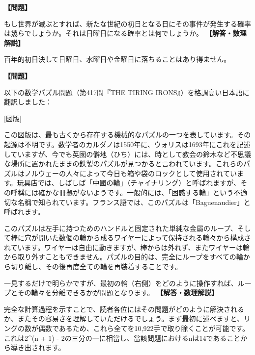 \documentclass[10pt,a4paper,oneside,openany]{ltjsbook}
\begin{document}
\begin{tcolorbox}[colback=softblue,colframe=primaryblue,title=\textbf{第 416 問：カレンダーのパズル （原題: A CALENDAR PUZZLE.）},arc=2mm,boxrule=1pt,breakable]
\textbf{【問題】}\par\vspace{0.3em}
もし世界が滅ぶとすれば、新たな世紀の初日となる日にその事件が発生する確率は幾らでしょうか。それは日曜日になる確率とは何でしょうか。
\tcblower
\textbf{【解答・数理解説】}\par\vspace{0.3em}
百年的初日決して日曜日、水曜日や金曜日に落ちることはあり得ません。
\end{tcolorbox}

\begin{tcolorbox}[colback=softblue,colframe=primaryblue,title=\textbf{第 417 問：疲労する鐸羣れ （原題: THE TIRING IRONS.）},arc=2mm,boxrule=1pt,breakable]
\textbf{【問題】}\par\vspace{0.3em}
以下の数学パズル問題（第417問『THE TIRING IRONS』）を格調高い日本語に翻訳しました：

[図版]

この図版は、最も古くから存在する機械的なパズルの一つを表しています。その起源は不明です。数学者のカルダノは1550年に、ウォリスは1693年にこれを記述していますが、今でも英國の僻地（ひち）には、時として教会の鈴木など不思議な場所に置かれたままの鉄製のパズルが見つかると言われています。これらのパズルはノルウェーの人々によって今日も箱や袋のロックとして使用されています。玩具店では、しばしば「中國の輪」（チャイナリング）と呼ばれますが、その呼稱には確かな冊拠がないようです。一般的には、「困惑する輪」という不適切な名稱で知られています。フランス語では、このパズルは「Baguenaudier」と呼ばれます。

このパズルは左手に持つためのハンドルと固定された単純な金屬のループ、そして棒に穴が開いた数個の輪から成るワイヤーによって保持される輪々から構成されています。ワイヤーは自由に動きますが、棒からは外れず、またワイヤーは輪から取り外すこともできません。パズルの目的は、完全にループをすべての輪から切り離し、その後再度全ての輪を再裝着することです。

一見するだけで明らかですが、最初の輪（右側）をどのように操作すれば、ループとその輪々を分離できるかが問題となります。
\tcblower
\textbf{【解答・数理解説】}\par\vspace{0.3em}

完全な計算過程を示すことで、読者各位にはその問題がどのように解決されるか、またその容易さを理解していただけるでしょう。まず最初に述べますと、リングの数が偶数であるため、これら全てを10,922手で取り除くことが可能です。これは2\textasciicircum{}(n + 1) - 2の三分の一に相當し、當該問題におけるnは14であることから導き出されます。


\end{tcolorbox}
\end{document}
